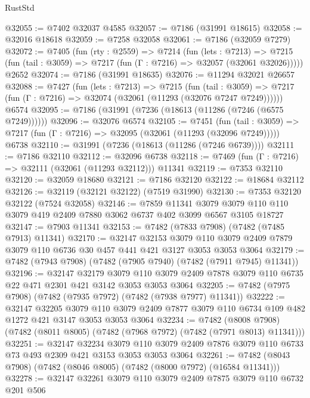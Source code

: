 \begin{lexlean}{RustStd}
\begin{coremodule}
{\begin{coremodule}
{{{{{{{{{{{{{{{{{{{{{{{{{{{{{{{{@32055 := @7402 @32037 @4585
@32057 := @7186 (@31991 @18615)
@32058 := @32016 @18618
@32059 := @7258 @32058
@32061 := @7186 (@32059 @7279)
@32072 := @7405
    (fun (rty : @2559) =>
    @7214
      (fun (lets : @7213) =>
      @7215 (fun (tail : @3059) => @7217 (fun (Γ : @7216) => @32057 (@32061 @32026)))))
    @2652
@32074 := @7186 (@31991 @18635)
@32076 := @11294 @32021 @26657
@32088 := @7427
    (fun (lets : @7213) =>
    @7215
      (fun (tail : @3059) =>
      @7217 (fun (Γ : @7216) => @32074 (@32061 (@11293 (@32076 @7247 @7249))))))
    @6574
@32095 := @7186 (@31991 (@7236 (@18613 (@11286 (@7246 (@6575 @7249))))))
@32096 := @32076 @6574
@32105 := @7451
    (fun (tail : @3059) => @7217 (fun (Γ : @7216) => @32095 (@32061 (@11293 (@32096 @7249)))))
    @6738
@32110 := @31991 (@7236 (@18613 (@11286 (@7246 @6739))))
@32111 := @7186 @32110
@32112 := @32096 @6738
@32118 := @7469 (fun (Γ : @7216) => @32111 (@32061 (@11293 @32112))) @11341
@32119 := @7353 @32110
@32120 := @32059 @18680
@32121 := @7186 @32120
@32122 := @18684 @32112
@32126 := @32119 (@32121 @32122) (@7519 @31990)
@32130 := @7353 @32120 @32122 (@7524 @32058)
@32146 := @7859
    @11341
    @3079
    @3079
    @110
    @110
    @3079
    @419
    @2409
    @7880
    @3062
    @6737
    @402
    @3099
    @6567
    @3105
    @18727
@32147 := @7903 @11341
@32153 := @7482 (@7833 @7908) (@7482 (@7485 @7913) @11341)
@32170 := @32147
    @32153
    @3079
    @110
    @3079
    @2409
    @7879
    @3079
    @110
    @6736
    @30
    @457
    @441
    @421
    @3127
    @3053
    @3053
    @3064
@32179 := @7482 (@7943 @7908) (@7482 (@7905 @7940) (@7482 (@7911 @7945) @11341))
@32196 := @32147
    @32179
    @3079
    @110
    @3079
    @2409
    @7878
    @3079
    @110
    @6735
    @22
    @471
    @2301
    @421
    @3142
    @3053
    @3053
    @3064
@32205 := @7482 (@7975 @7908) (@7482 (@7935 @7972) (@7482 (@7938 @7977) @11341))
@32222 := @32147
    @32205
    @3079
    @110
    @3079
    @2409
    @7877
    @3079
    @110
    @6734
    @109
    @482
    @1272
    @421
    @3147
    @3053
    @3053
    @3064
@32234 := @7482
    (@8008 @7908)
    (@7482 (@8011 @8005) (@7482 (@7968 @7972) (@7482 (@7971 @8013) @11341)))
@32251 := @32147
    @32234
    @3079
    @110
    @3079
    @2409
    @7876
    @3079
    @110
    @6733
    @73
    @493
    @2309
    @421
    @3153
    @3053
    @3053
    @3064
@32261 := @7482 (@8043 @7908) (@7482 (@8046 @8005) (@7482 (@8000 @7972) (@16584 @11341)))
@32278 := @32147
    @32261
    @3079
    @110
    @3079
    @2409
    @7875
    @3079
    @110
    @6732
    @201
    @506
}}}}}}}}}}}}}}}}}}}}}}}}}}}}}}}}
\end{coremodule}}
\end{coremodule}
\end{lexlean}
